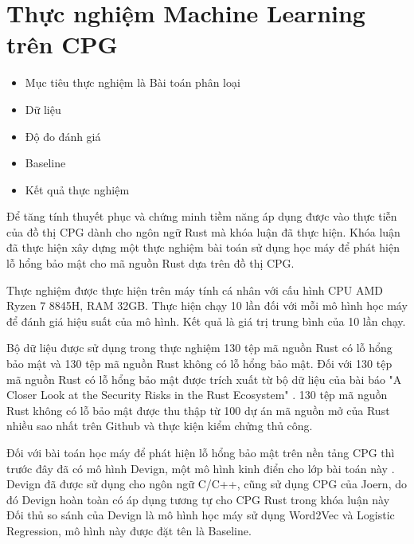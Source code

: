 \section{Thực nghiệm Machine Learning trên CPG}

\begin{itemize}
    \item Mục tiêu thực nghiệm là Bài toán phân loại
    \item Dữ liệu
    \item Độ đo đánh giá
    \item Baseline
    \item Kết quả thực nghiệm
\end{itemize}

Để tăng tính thuyết phục và chứng minh tiềm năng áp dụng được vào thực tiễn của đồ thị CPG dành cho ngôn ngữ Rust mà khóa luận đã thực hiện.
Khóa luận đã thực hiện xây dựng một thực nghiệm bài toán sử dụng học máy để phát hiện lỗ hổng bảo mật cho mã nguồn Rust dựa trên đồ thị CPG.

Thực nghiệm được thực hiện trên máy tính cá nhân với cấu hình CPU AMD Ryzen 7 8845H, RAM 32GB.
Thực hiện chạy 10 lần đối với mỗi mô hình học máy để đánh giá hiệu suất của mô hình.
Kết quả là giá trị trung bình của 10 lần chạy.

Bộ dữ liệu được sử dụng trong thực nghiệm 130 tệp mã nguồn Rust có lỗ hổng bảo mật và 130 tệp mã nguồn Rust không có lỗ hổng bảo mật.
Đối với 130 tệp  mã nguồn Rust có lỗ hổng bảo mật được trích xuất từ bộ dữ liệu của bài báo "A Closer Look at the Security Risks in the Rust Ecosystem" \cite{zheng2023closer}.
130 tệp mã nguồn Rust không có lỗ bảo mật được thu thập từ 100 dự án mã nguồn mở của Rust nhiều sao nhất trên Github \cite{githubGithubRankingTop100RustmdMaster} và thực kiện kiểm chửng thủ công.

Đối với bài toán học máy để phát hiện lỗ hổng bảo mật trên nền tảng CPG thì trước đây đã có mô hình Devign, một mô hình kinh điển cho lớp bài toán này \cite{zhou2019devign}.
Devign đã được sử dụng cho ngôn ngữ C/C++, cũng sử dụng CPG của Joern, do đó Devign hoàn toàn có áp dụng tương tự cho CPG Rust trong khóa luận này
Đối thủ so sánh của Devign là mô hình học máy sử dụng Word2Vec và Logistic Regression, mô hình này được đặt tên là Baseline.

